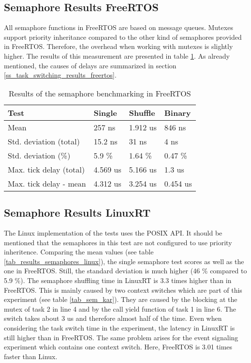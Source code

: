 \subsection{Semaphore Results FreeRTOS}
All semaphore functions in FreeRTOS are based on message queues.
Mutexes support priority inheritance compared to the other kind of semaphores provided in FreeRTOS.
Therefore, the overhead when working with mutexes is slightly higher. 
The results of this measurement are presented in table \ref{tab_results_semaphores_freertos}. 
As already mentioned, the causes of delays are summarized in section \ref{ss_task_switching_results_freertos}.

\begin{table}[htbp]
	\centering
		\begin{tabular}{|l||l|l|l|}
			\hline
				Test 											& Single 		& Shuffle 	& Binary 	  \\
				\hline 
				Mean  										& 257 ns		& 1.912 us	& 846 ns	  \\
			  \hline
			  Std. deviation (total)	  & 15.2 ns		& 31 ns			&	4 ns		  \\
			  \hline
			  Std. deviation (\%)  			& 5.9 \%		& 1.64 \%		&	0.47 \%   \\ 
			  \hline
			  Max. tick delay	(total)		& 4.569 us	& 5.166 us	&	1.3 us    \\
				\hline
				Max. tick delay - mean		&	4.312	us	&	3.254	us	&	0.454 us  \\
			\hline
		\end{tabular}
	\caption{Results of the semaphore benchmarking in FreeRTOS}
	\label{tab_results_semaphores_freertos}
\end{table}

\subsection{Semaphore Results LinuxRT}
The Linux implementation of the tests uses the POSIX \ac{API}.
It should be mentioned that the semaphores in this test are not configured to use priority inheritence. 
Comparing the mean values (see table \ref{tab_results_semaphores_linux}), the single semaphore test scores as well as the one in FreeRTOS.
Still, the standard deviation is much higher (46 \% compared to 5.9 \%).
The semaphore shuffling time in LinuxRT is 3.3 times higher than in FreeRTOS.
This is mainly caused by two context switches which are part of this experiment (see table \ref{tab_sem_kar}). 
They are caused by the blocking at the mutex of task 2 in line 4 and by the call yield function of task 1 in line 6.
The switch takes about 3 us and therefore almost half of the time. 
Even when considering the task switch time in the experiment, the latency in LinuxRT is still higher than in FreeRTOS.
The same problem arises for the event signaling experiment which contains one context switch.
Here, FreeRTOS is 3.01 times faster than Linux. 


